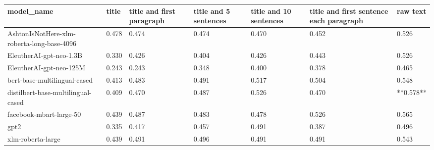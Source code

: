 \begin{tabular}{lllllll}
\toprule
                                model\_name & title & title and first paragraph & title and 5 sentences & title and 10 sentences & title and first sentence each paragraph &  raw text \\
\midrule
AshtonIsNotHere-xlm-roberta-long-base-4096 & 0.478 &                     0.474 &                 0.474 &                  0.470 &                                   0.452 &     0.526 \\
                   EleutherAI-gpt-neo-1.3B & 0.330 &                     0.426 &                 0.404 &                  0.426 &                                   0.443 &     0.526 \\
                   EleutherAI-gpt-neo-125M & 0.243 &                     0.243 &                 0.348 &                  0.400 &                                   0.378 &     0.465 \\
              bert-base-multilingual-cased & 0.413 &                     0.483 &                 0.491 &                  0.517 &                                   0.504 &     0.548 \\
        distilbert-base-multilingual-cased & 0.409 &                     0.470 &                 0.487 &                  0.526 &                                   0.470 & **0.578** \\
                   facebook-mbart-large-50 & 0.439 &                     0.487 &                 0.483 &                  0.478 &                                   0.526 &     0.565 \\
                                      gpt2 & 0.335 &                     0.417 &                 0.457 &                  0.491 &                                   0.387 &     0.496 \\
                         xlm-roberta-large & 0.439 &                     0.491 &                 0.496 &                  0.491 &                                   0.491 &     0.543 \\
\bottomrule
\end{tabular}
